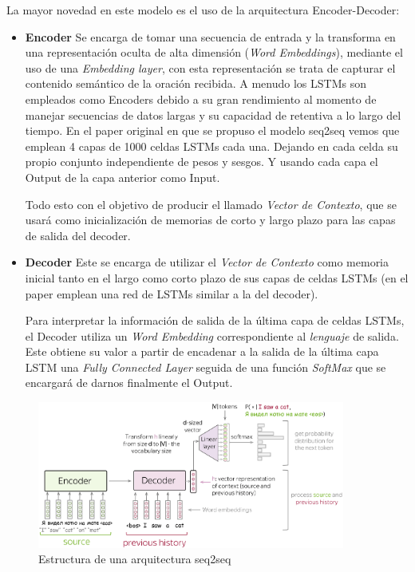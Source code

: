 La mayor novedad en este modelo es el uso de la arquitectura Encoder-Decoder:
\begin{itemize}
	\item \textbf{Encoder} Se encarga de tomar una secuencia de entrada y la transforma en una representación oculta de alta dimensión (\textit{Word Embeddings}), mediante el uso de una \textit{Embedding layer}, con esta representación se trata de capturar el contenido semántico de la oración recibida. A menudo los LSTMs son empleados como Encoders debido a su gran rendimiento al momento de manejar secuencias de datos largas y su capacidad de retentiva a lo largo del tiempo. En el paper original \cite{sutskever2014sequence} en que se propuso el modelo seq2seq vemos que emplean 4 capas de 1000 celdas LSTMs cada una. Dejando en cada celda su propio conjunto independiente de pesos y sesgos. Y usando cada capa el Output de la capa anterior como Input.

Todo esto con el objetivo de producir el llamado \textit{Vector de Contexto}, que se usará como inicialización de memorias de corto y largo plazo para las capas de salida del decoder.

	\item \textbf{Decoder} Este se encarga de utilizar el \textit{Vector de Contexto} como memoria inicial tanto en el largo como corto plazo de sus capas de celdas LSTMs (en el paper \cite{sutskever2014sequence} emplean una red de LSTMs similar a la del decoder).

Para interpretar la información de salida de la última capa de celdas LSTMs, el Decoder utiliza un \textit{Word Embedding} correspondiente al \textit{lenguaje} de salida. Este obtiene su valor a partir de encadenar a la salida de la última capa LSTM una \textit{Fully Connected Layer} seguida de una función \textit{SoftMax} que se encargará de darnos finalmente el Output.

\end{itemize}

\begin{figure}[h]
	\centering
	\includegraphics[width = 0.9\textwidth]{Imagenes/Vectorial/seq2seq.pdf}
	\caption{Estructura de una arquitectura seq2seq}%
	\label{fig:seq2seq}
\end{figure}

